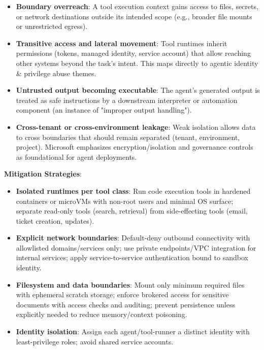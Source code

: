 \begin{TNtwocol}
    \begin{itemize}
        \item \textbf{Boundary overreach}: A tool execution context gains access to files, secrets, or network destinations outside its intended scope (e.g., broader file mounts or unrestricted egress).
        \item \textbf{Transitive access and lateral movement}: Tool runtimes inherit permissions (tokens, managed identity, service account) that allow reaching other systems beyond the task's intent. This maps directly to agentic identity \& privilege abuse themes.
        \item \textbf{Untrusted output becoming executable}: The agent's generated output is treated as safe instructions by a downstream interpreter or automation component (an instance of "improper output handling").
        \item \textbf{Cross-tenant or cross-environment leakage}: Weak isolation allows data to cross boundaries that should remain separated (tenant, environment, project). Microsoft emphasizes encryption/isolation and governance controls as foundational for agent deployments.
    \end{itemize}

    \textbf{Mitigation Strategies}:

    \begin{itemize}
        \item \textbf{Isolated runtimes per tool class}: Run code execution tools in hardened containers or microVMs with non-root users and minimal OS surface; separate read-only tools (search, retrieval) from side-effecting tools (email, ticket creation, updates).

        \item \textbf{Explicit network boundaries}: Default-deny outbound connectivity with allowlisted domains/services only; use private endpoints/VPC integration for internal services; apply service-to-service authentication bound to sandbox identity.

        \item \textbf{Filesystem and data boundaries}: Mount only minimum required files with ephemeral scratch storage; enforce brokered access for sensitive documents with access checks and auditing; prevent persistence unless explicitly needed to reduce memory/context poisoning.

        \item \textbf{Identity isolation}: Assign each agent/tool-runner a distinct identity with least-privilege roles; avoid shared service accounts.


\end{itemize}
\end{TNtwocol}
